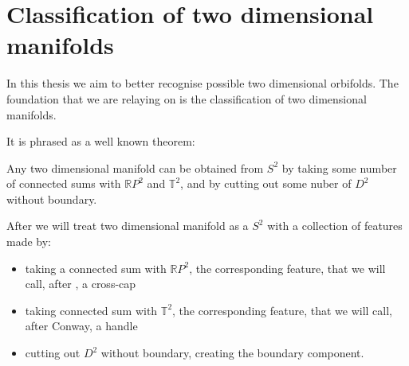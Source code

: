 

\section{Classification of two dimensional manifolds}\label{2 dim manifolds}
In this thesis we aim to better recognise possible two dimensional orbifolds. 
The foundation that we are relaying on is the classification of two dimensional manifolds. 

It is phrased as a well known theorem:
\begin{theorem}
Any two dimensional manifold can be obtained from $S^2$ by taking some number of 
connected sums with $\mathbb{R}P^2$ and $\mathbb{T}^2$, and by cutting out 
some nuber of $D^2$ without boundary.
\end{theorem}

After \cite{Conway2016} we will treat two dimensional manifold as a $S^2$ with 
a collection of features
made by:
\begin{itemize}
\item taking a connected sum with $\mathbb{R}P^2$, the corresponding feature, that
we will call, after \cite{Conway2016}, a cross-cap
\item taking connected sum with $\mathbb{T}^2$, the corresponding feature, that we will call, 
after Conway, a handle
\item cutting out $D^2$ without boundary, creating the boundary component. 
\end{itemize}






